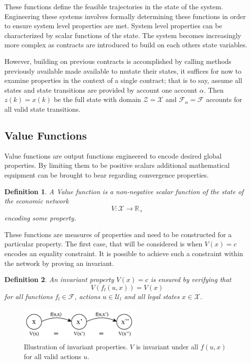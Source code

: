 \documentclass[letterpaper, 10 pt, conference]{ieeeconf}  %
\newtheorem{definition}{Definition}
\begin{document}
These functions define the feasible trajectories in the state of the system. Engineering these systems involves formally determining these functions in order to ensure system level properties are met. System level properties can be characterized by scalar functions of the state. The system becomes increasingly more complex as contracts are introduced to build on each others state variables. 

However, building on previous contracts is accomplished by calling methods previously available made available to mutate their states, it suffices for now to examine properties in the context of a single contract; that is to say, assume all states and state transitions are provided by account one account $\alpha$. Then $z(k)=x(k)$ be the full state with domain $\mathcal{Z} =\mathcal{X}$ and $\mathcal{F}_{\alpha}=\mathcal{F}$ accounts for all valid state transitions.

\subsection{Value Functions}

Value functions are output functions engineered to encode desired global properties. By limiting them to be positive scalars additional mathematical equipment can be brought to bear regarding convergence properties.

\begin{definition}
A Value function is a non-negative scalar function of the state of the economic network
\[
V: \mathcal{X} \rightarrow \mathbb{R}_+
\]
encoding some property.
\end{definition}

These functions are measures of properties and need to be constructed for a particular property. The first case, that will be considered is when $V(x)=c$ encodes an equality constraint. It is possible to achieve such a constraint within the network by proving an invariant.

\begin{definition} \label{invariant}
An invariant property $V(x)=c$ is ensured by verifying that
\[
V(f_l(u,x)) = V(x)
\]
for all functions $f_l\in \mathcal{F}$, actions $u\in \mathcal{U}_l$ and all legal states $x\in\mathcal{X}$.
\end{definition}
\begin{figure}[h]
\includegraphics[width=6cm]{invariant.png}
\centering
\caption{Illustration of invariant properties. $V$ is invariant under all $f(u, x)$ for all valid actions $u$. }
\centering
\end{figure}
\end{document}
